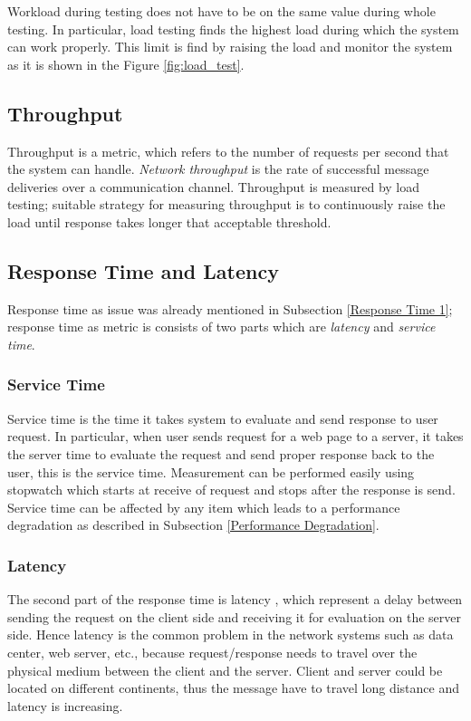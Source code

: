 Workload during testing does not have to be on the same value during whole testing. In particular, load testing finds the highest load during which the system can work properly. This limit is find by raising the load and monitor the system as it is shown in the Figure \ref{fig:load_test}.

\subsection{Throughput}
Throughput is a metric, which refers to the number of requests per second that the system can handle. \emph{Network throughput} is the rate of successful message deliveries over a communication channel. Throughput is measured by load testing; suitable strategy for measuring throughput is to continuously raise the load until response takes longer that acceptable threshold. 

\subsection{Response Time and Latency}
Response time as issue was already mentioned in Subsection \ref{Response Time 1}; response time as metric is consists of two parts which are \emph{latency} and \emph{service time}.

\subsubsection*{Service Time}
Service time is the time it takes system to evaluate and send response to user request. In particular, when user sends request for a web page to a server, it takes the server time to evaluate the request and send proper response back to the user, this is the service time. Measurement can be performed easily using stopwatch which starts at receive of request and stops after the response is send. Service time can be affected by any item which leads to a performance degradation as described in Subsection \ref{Performance Degradation}.

\subsubsection*{Latency}
The second part of the response time is latency \cite{Broadwell:RPT, BHATT:PERF}, which represent a delay between sending the request on the client side and receiving it for evaluation on the server side. Hence latency is the common problem in the network systems such as data center, web server, etc., because request/response needs to travel over the physical medium between the client and the server. Client and server could be located on different continents, thus the message have to travel long distance and latency is increasing.

